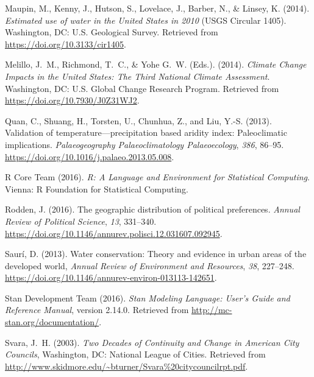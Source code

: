 \documentclass[draft,linenumbers]{agujournal}\usepackage{knitr}
\begin{document}
\begin{thebibliography}{33}
  Maupin, M., Kenny, J., Hutson, S., Lovelace, J., Barber, N., \& Linsey, K. (2014).
  \textit{Estimated use of water in the {U}nited {S}tates in 2010\/}
  (USGS Circular 1405).
  Washington, DC: U.S. Geological Survey.
  Retrieved from
  \url{https://doi.org/10.3133/cir1405}.

  Melillo, J.~M., Richmond, T.~C., \&  Yohe G.~W. (Eds.). (2014).
  \textit{Climate Change Impacts in the {U}nited {S}tates: {T}he Third National Climate
  Assessment}.
  Washington, DC: U.S. Global Change Research Program.
  Retrieved from \url{https://doi.org/10.7930/J0Z31WJ2}.

  Quan, C., Shuang, H., Torsten, U., Chunhua, Z., and Liu, Y.-S. (2013).
  Validation of temperature---precipitation based aridity index: Paleoclimatic
  implications.
  \textit{Palaeogeography Palaeoclimatology Palaeoecology}, \textit{386}, 86--95.
  \url{https://doi.org/10.1016/j.palaeo.2013.05.008}.

  {R Core Team} (2016). \textit{R: A Language and Environment for Statistical
  Computing}.
  Vienna: R Foundation for Statistical Computing.

  Rodden, J. (2016).
  The geographic distribution of political preferences.
  \textit{Annual Review of Political Science}, \textit{13}, 331--340.
  \url{https://doi.org/10.1146/annurev.polisci.12.031607.092945}.

  Saur\'i, D. (2013).
  Water conservation: {T}heory and evidence in urban areas of the developed world,
  \textit{Annual Review of Environment and Resources}, \textit{38}, 227--248.
  \url{https://doi.org/10.1146/annurev-environ-013113-142651}.

  {Stan Development Team} (2016).
  \textit{{S}tan Modeling Language: User's Guide and Reference Manual}, version 2.14.0.
  Retrieved from
  \url{http://mc-stan.org/documentation/}.

  Svara, J.~H. (2003).
  \textit{Two Decades of Continuity and Change in American City Councils},
  Washington, DC: National League of Cities.
  Retrieved from
  \url{http://www.skidmore.edu/~bturner/Svara%20citycouncilrpt.pdf}.


\end{thebibliography}
\end{document}
